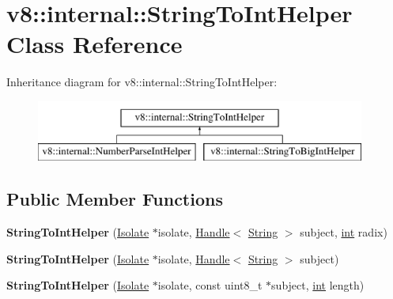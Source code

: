 \hypertarget{classv8_1_1internal_1_1StringToIntHelper}{}\section{v8\+:\+:internal\+:\+:String\+To\+Int\+Helper Class Reference}
\label{classv8_1_1internal_1_1StringToIntHelper}
Inheritance diagram for v8\+:\+:internal\+:\+:String\+To\+Int\+Helper\+:\begin{figure}[H]
\begin{center}
\leavevmode
\includegraphics[height=2.000000cm]{classv8_1_1internal_1_1StringToIntHelper}
\end{center}
\end{figure}
\subsection*{Public Member Functions}
\begin{DoxyCompactItemize}
\item 
\mbox{\label{classv8_1_1internal_1_1StringToIntHelper_a55eff296e0969e0a61323e31bceacc68}} 
{\bfseries String\+To\+Int\+Helper} (\mbox{\hyperlink{classv8_1_1internal_1_1Isolate}{Isolate}} $\ast$isolate, \mbox{\hyperlink{classv8_1_1internal_1_1Handle}{Handle}}$<$ \mbox{\hyperlink{classv8_1_1internal_1_1String}{String}} $>$ subject, \mbox{\hyperlink{classint}{int}} radix)
\item 
\mbox{\label{classv8_1_1internal_1_1StringToIntHelper_a6810a69fca9d0acd37c1354be0ac8cf5}} 
{\bfseries String\+To\+Int\+Helper} (\mbox{\hyperlink{classv8_1_1internal_1_1Isolate}{Isolate}} $\ast$isolate, \mbox{\hyperlink{classv8_1_1internal_1_1Handle}{Handle}}$<$ \mbox{\hyperlink{classv8_1_1internal_1_1String}{String}} $>$ subject)
\item 
\mbox{\label{classv8_1_1internal_1_1StringToIntHelper_af80520d3b1267c6bdd9ed3fab1f24b90}} 
{\bfseries String\+To\+Int\+Helper} (\mbox{\hyperlink{classv8_1_1internal_1_1Isolate}{Isolate}} $\ast$isolate, const uint8\+\_\+t $\ast$subject, \mbox{\hyperlink{classint}{int}} length)
\end{DoxyCompactItemize}
